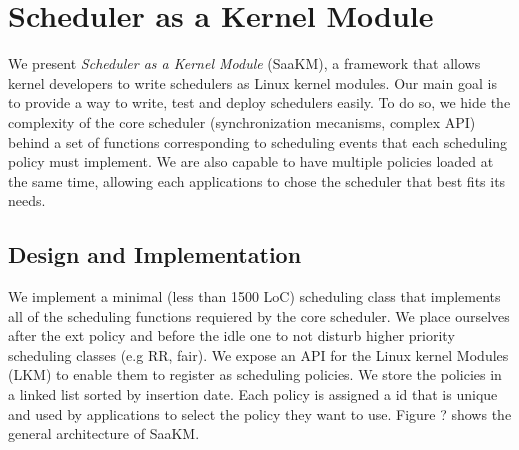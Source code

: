 \section{Scheduler as a Kernel Module}
\label{sec:scheduler-as-a-kernel-module}

\par We present \textit{Scheduler as a Kernel Module} (SaaKM), a framework that allows kernel developers to write schedulers as Linux kernel modules. Our main goal is to provide a way to write, test and deploy schedulers easily. To do so, we hide the complexity of the core scheduler (synchronization mecanisms, complex API) behind a set of functions corresponding to scheduling events that each scheduling policy must implement. We are also capable to have multiple policies loaded at the same time, allowing each applications to chose the scheduler that best fits its needs.

\subsection{Design and Implementation}

\par We implement a minimal (less than 1500 LoC) scheduling class that implements all of the scheduling functions requiered by the core scheduler. We place ourselves after the ext policy and before the idle one to not disturb higher priority scheduling classes (e.g RR, fair). We expose an API for the Linux kernel Modules (LKM) to enable them to register as scheduling policies. We store the policies in a linked list sorted by insertion date. Each policy is assigned a id that is unique and used by applications to select the policy they want to use. Figure ? shows the general architecture of SaaKM. \newline

